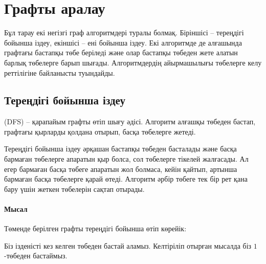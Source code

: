 \chapter{Графты аралау}

Бұл тарау екі негізгі граф алгоритмдері туралы болмақ.
Біріншісі -- тереңдігі бойынша іздеу, екіншісі -- ені бойынша іздеу. 
Екі алгоритмде де алғашында графтағы бастапқы төбе беріледі және олар бастапқы төбеден жете алатын барлық төбелерге барып шығады.
Алгоритмдердің айырмашылығы төбелерге келу реттілігіне байланысты туындайды.

\section{Тереңдігі бойынша іздеу}


 (DFS) --
қарапайым графты өтіп шығу әдісі.
Алгоритм алғашқы төбеден бастап, графтағы қырларды қолдана отырып, басқа төбелерге жетеді.

Тереңдігі бойынша іздеу әрқашан бастапқы төбеден басталады және басқа бармаған төбелерге апаратын қыр болса, сол төбелерге тікелей жалғасады. Ал егер бармаған басқа төбеге апаратын жол болмаса, кейін қайтып, артынша бармаған басқа төбелерге қарай өтеді.
Алгоритм әрбір төбеге тек бір рет қана бару үшін жеткен төбелерін сақтап отырады.

\subsubsection*{Мысал}

Төменде берілген графты тереңдігі бойынша өтіп көрейік:
\begin{center}
\end{center}
Біз ізденісті кез келген төбеден бастай аламыз. Келтіріліп отырған мысалда біз $1$-төбеден бастаймыз.

